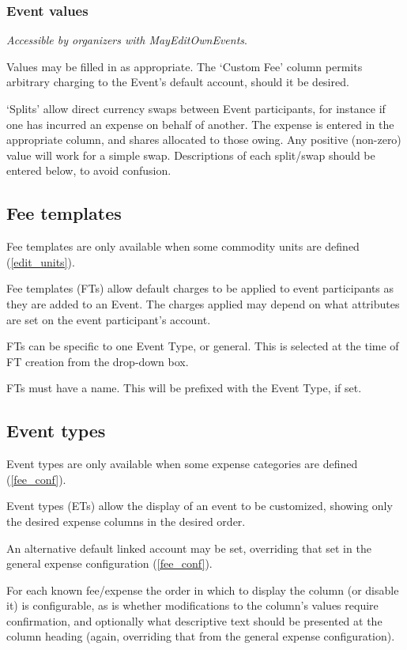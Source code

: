 \documentclass{report}
\begin{document}
\subsubsection{Event values}

\emph{Accessible by organizers with MayEditOwnEvents}.

Values may be filled in as appropriate.  The `Custom Fee' column permits arbitrary charging to the Event's default account, should it be desired.

`Splits' allow direct currency swaps between Event participants, for instance if one has incurred an expense on behalf of another.  The expense is entered in the appropriate column, and shares allocated to those owing.  Any positive (non-zero) value will work for a simple swap.  Descriptions of each split/swap should be entered below, to avoid confusion.

\subsection{Fee templates}\label{fts}
Fee templates are only available when some commodity units are defined (\autoref{edit_units}).

Fee templates (FTs) allow default charges to be applied to event participants as they are added to an Event.  The charges applied may depend on what attributes are set on the event participant's account.

FTs can be specific to one Event Type, or general.  This is selected at the time of FT creation from the drop-down box.

FTs must have a name.  This will be prefixed with the Event Type, if set.

\subsection{Event types}

Event types are only available when some expense categories are defined (\autoref{fee_conf}).

Event types (ETs) allow the display of an event to be customized, showing only the desired expense columns in the desired order.

An alternative default linked account may be set, overriding that set in the general expense configuration (\autoref{fee_conf}).

For each known fee/expense the order in which to display the column (or disable it) is configurable, as is whether modifications to the column's values require confirmation, and optionally what descriptive text should be presented at the column heading (again, overriding that from the general expense configuration).
\end{document}
